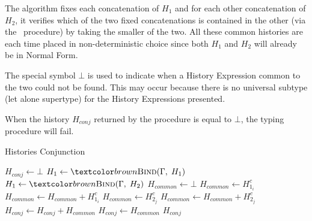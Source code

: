 The algorithm fixes each concatenation of $H_1$ and for each other concatenation of $H_2$, it verifies which of the two fixed concatenations is contained in the other (via the \subconc\ procedure) by taking the smaller of the two. All these common histories are each time placed in non-deterministic choice since both $H_1$ and $H_2$ will already be in Normal Form.

The special symbol $\bot$ is used to indicate when a History Expression common to the two could not be found. This may occur because there is no universal subtype (let alone supertype) for the History Expressions presented.

When the history $H_{conj}$ returned by the procedure is equal to $\bot$, the typing procedure will fail.

\begin{algorithm}[H]
    \caption{Histories Conjunction}\label{alg:conj-hist}
    \begin{algorithmic}[1]
            \State $H_{conj} \gets \bot$
            \State $H_1 \gets \bind(\Gamma, \;H_1)$
            \State $H_1 \gets \bind(\Gamma, \;H_2)$
                \State $H_{common} \gets \bot$
                            \State $H_{common} \gets H^c_{1_i}$
                        \Else
                            \State $H_{common} \gets H_{common} + H^c_{1_i}$
                        \EndIf
                            \State $H_{common} \gets H^c_{2_j}$
                        \Else
                            \State $H_{common} \gets H_{common} + H^c_{2_j}$
                        \EndIf
                    \EndIf                       
                \EndFor
                        \State $H_{conj} \gets H_{conj} + H_{common}$
                    \Else
                        \State $H_{conj} \gets H_{common}$
                    \EndIf
                \EndIf
            \EndFor
            \State \Return $H_{conj}$
        \EndProcedure
    \end{algorithmic}
\end{algorithm}

